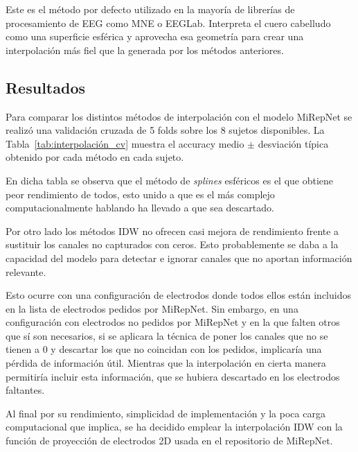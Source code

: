 Este es el método por defecto utilizado en la mayoría de librerías de procesamiento de EEG como MNE o EEGLab. Interpreta el cuero cabelludo como una superficie esférica y aprovecha esa geometría para crear una interpolación más fiel que la generada por los métodos anteriores.

\subsection{Resultados}
\label{subsec:resultados_interpolación}

Para comparar los distintos métodos de interpolación con el modelo MiRepNet se realizó una validación cruzada de 5 folds sobre los 8 sujetos disponibles. La Tabla~\ref{tab:interpolación_cv} muestra el accuracy medio $\pm$ desviación típica obtenido por cada método en cada sujeto.

En dicha tabla se observa que el método de \textit{splines} esféricos es el que obtiene peor rendimiento de todos, esto unido a que es el más complejo computacionalmente hablando ha llevado a que sea descartado. 

Por otro lado los métodos IDW no ofrecen casi mejora de rendimiento frente a sustituir los canales no capturados con ceros. Esto probablemente se daba a la capacidad del modelo para detectar e ignorar canales que no aportan información relevante. 

Esto ocurre con una configuración de electrodos donde todos ellos están incluidos en la lista de electrodos pedidos por MiRepNet. Sin embargo, en una configuración con electrodos no pedidos por MiRepNet y en la que falten otros que sí son necesarios, si se aplicara la técnica de poner los canales que no se tienen a 0 y descartar los que no coincidan con los pedidos, implicaría una pérdida de información útil. Mientras que la interpolación en cierta manera permitiría incluir esta información, que se hubiera descartado en los electrodos faltantes. 

Al final por su rendimiento, simplicidad de implementación y la poca carga computacional que implica, se ha decidido emplear la interpolación IDW con la función de proyección de electrodos 2D usada en el repositorio de MiRepNet. 

